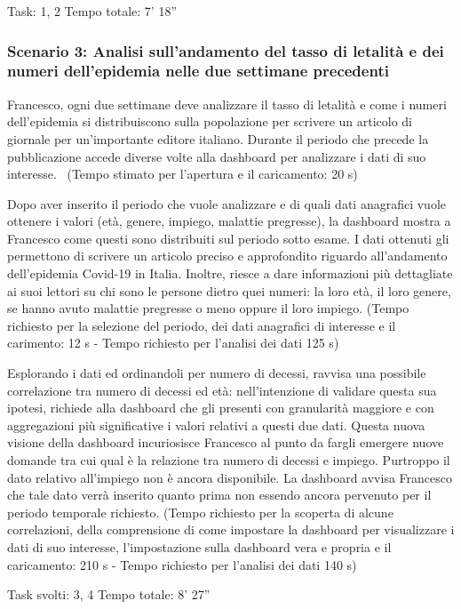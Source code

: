 Task: 1, 2
Tempo totale: 7' 18''

\subsubsection*{Scenario 3: Analisi sull'andamento del tasso di letalità e dei numeri dell'epidemia nelle due settimane precedenti}
Francesco, ogni due settimane deve analizzare il tasso di letalità e come i numeri dell’epidemia si distribuiscono sulla popolazione per scrivere un articolo di giornale per un’importante editore italiano. Durante il periodo che precede la pubblicazione accede diverse volte alla dashboard per analizzare i dati di suo interesse. 
(Tempo stimato per l'apertura e il caricamento: 20 s)

Dopo aver inserito il periodo che vuole analizzare e di quali dati anagrafici vuole ottenere i valori (età, genere, impiego, malattie pregresse), la dashboard mostra a Francesco come questi sono distribuiti sul periodo sotto esame. 
I dati ottenuti gli permettono di scrivere un articolo preciso e approfondito riguardo all'andamento dell'epidemia Covid-19 in Italia. Inoltre, riesce a dare informazioni più dettagliate ai suoi lettori su chi sono le persone dietro quei numeri: la loro età, il loro genere, se hanno avuto malattie pregresse o meno oppure il loro impiego.
(Tempo richiesto per la selezione del periodo, dei dati anagrafici di interesse e il carimento: 12 s - Tempo richiesto per l'analisi dei dati 125 s)

Esplorando i dati ed ordinandoli per numero di decessi, ravvisa una possibile correlazione tra numero di decessi ed età: nell'intenzione di validare questa sua ipotesi, richiede alla dashboard che gli presenti con granularità maggiore e con aggregazioni più significative i valori relativi a questi due dati. 
Questa nuova visione della dashboard incuriosisce Francesco al punto da fargli emergere nuove domande tra cui qual è la relazione tra numero di decessi e impiego. Purtroppo il dato relativo all'impiego non è ancora disponibile. La dashboard avvisa Francesco che tale dato verrà inserito quanto prima non essendo ancora pervenuto per il periodo temporale richiesto.
(Tempo richiesto per la scoperta di alcune correlazioni, della comprensione di come impostare la dashboard per visualizzare i dati di suo interesse, l'impostazione sulla dashboard vera e propria e il caricamento: 210 s - Tempo richiesto per l'analisi dei dati 140 s)

Task svolti: 3, 4
Tempo totale: 8' 27''

